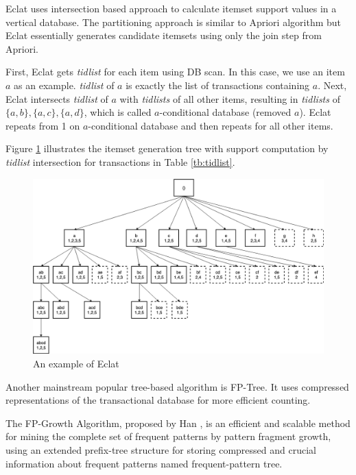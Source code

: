 \begin{definition}
\label{eclat}
Eclat \cite{eclat} uses intersection based approach to calculate itemset support values in a vertical database. The partitioning approach is similar to Apriori algorithm \cite{apriori} but Eclat essentially generates candidate itemsets using only the join step from Apriori. 
\end{definition}

First, Eclat gets \textit{tidlist} for each item using DB scan. In this case, we use an item $a$ as an example. \textit{tidlist} of $a$ is exactly the list of transactions containing $a$. Next, Eclat intersects \textit{tidlist} of $a$ with \textit{tidlists} of all other items, resulting in \textit{tidlists} of $\{a,b\}, \{a,c\}, \{a,d\}$, which is called $a$-conditional database (removed $a$). Eclat repeats from 1 on $a$-conditional database and then repeats for all other items.

Figure \ref{fig:eclat} \cite{survey2014} illustrates the itemset generation tree with support computation by \textit{tidlist} intersection for transactions in Table \ref{tb:tidlist}.

\begin{figure}[H]
    \centering
    \includegraphics[width=1.0\textwidth]{RelatedWorks/eclat.png}
    \caption{An example of Eclat \cite{survey2014}}
    \label{fig:eclat}
\end{figure}

Another mainstream popular tree-based algorithm is FP-Tree. It uses compressed representations of the transactional database for more efficient counting.

\begin{definition}
\label{FP}
The FP-Growth Algorithm, proposed by Han \cite{fp}, is an efficient and scalable method for mining the complete set of frequent patterns by pattern fragment growth, using an extended prefix-tree structure for storing compressed and crucial information about frequent patterns named frequent-pattern tree.
\end{definition}

